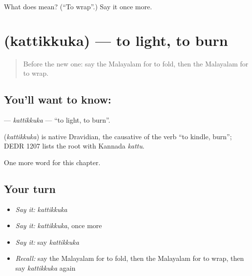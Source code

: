 \begin{tcolorbox}[breakable,colback=teal!4,colframe=teal!35!black,title={Before you move on}]
What does  mean? (\textquotedblleft{}To wrap\textquotedblright{}.) Say it once more.
\end{tcolorbox}
\section[\texorpdfstring{\ml{കത്തിക്കുക} (kattikkuka)}{കത്തിക്കുക (kattikkuka)}]{ (kattikkuka) — to light, to burn}

\label{lesson:ML-C265-kattikkuka}



\begin{quote}
Before the new one: say the Malayalam for to fold, then the Malayalam for to wrap.
\end{quote}

\subsection*{You'll want to know: }
\textbf{} — \emph{kattikkuka} — \textquotedblleft{}to light, to burn\textquotedblright{}.

\begin{cousinweb}
\textbf{} (\emph{kattikkuka}) is native Dravidian, the causative of the verb \textquotedblleft{}to kindle, burn\textquotedblright{}; DEDR 1207 lists the root with Kannada \emph{kattu}.
\end{cousinweb}

\begin{grammarlens}[title={What you've built}]
One more word for this chapter.
\end{grammarlens}

\subsection*{Your turn}
\begin{itemize}
\raggedright
  \item \emph{Say it:} \emph{kattikkuka}
  \item \emph{Say it:} \emph{kattikkuka}, once more
  \item \emph{Say it:} say \emph{kattikkuka}
  \item \emph{Recall:} say the Malayalam for to fold, then the Malayalam for to wrap, then say \emph{kattikkuka} again
\end{itemize}

